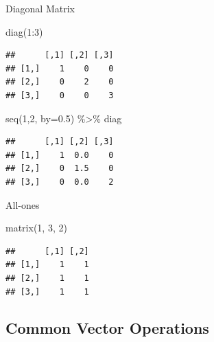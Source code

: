 \documentclass[
  ignorenonframetext,
]{beamer}
\newenvironment{Shaded}{\begin{snugshade}}{\end{snugshade}}
\newcommand{\AttributeTok}[1]{\textcolor[rgb]{0.77,0.63,0.00}{#1}}
\newcommand{\DecValTok}[1]{\textcolor[rgb]{0.00,0.00,0.81}{#1}}
\newcommand{\FloatTok}[1]{\textcolor[rgb]{0.00,0.00,0.81}{#1}}
\newcommand{\FunctionTok}[1]{\textcolor[rgb]{0.00,0.00,0.00}{#1}}
\newcommand{\NormalTok}[1]{#1}
\newcommand{\SpecialCharTok}[1]{\textcolor[rgb]{0.00,0.00,0.00}{#1}}
\begin{document}
\begin{frame}[fragile]{Diagonal Matrix}
\protect\hypertarget{diagonal-matrix}{}
\begin{Shaded}
\begin{Highlighting}[]
\FunctionTok{diag}\NormalTok{(}\DecValTok{1}\SpecialCharTok{:}\DecValTok{3}\NormalTok{)}
\end{Highlighting}
\end{Shaded}

\begin{verbatim}
##      [,1] [,2] [,3]
## [1,]    1    0    0
## [2,]    0    2    0
## [3,]    0    0    3
\end{verbatim}

\begin{Shaded}
\begin{Highlighting}[]
\FunctionTok{seq}\NormalTok{(}\DecValTok{1}\NormalTok{,}\DecValTok{2}\NormalTok{, }\AttributeTok{by=}\FloatTok{0.5}\NormalTok{) }\SpecialCharTok{\%\textgreater{}\%}\NormalTok{ diag}
\end{Highlighting}
\end{Shaded}

\begin{verbatim}
##      [,1] [,2] [,3]
## [1,]    1  0.0    0
## [2,]    0  1.5    0
## [3,]    0  0.0    2
\end{verbatim}
\end{frame}

\begin{frame}[fragile]{All-ones}
\protect\hypertarget{all-ones}{}
\begin{Shaded}
\begin{Highlighting}[]
\FunctionTok{matrix}\NormalTok{(}\DecValTok{1}\NormalTok{, }\DecValTok{3}\NormalTok{, }\DecValTok{2}\NormalTok{)}
\end{Highlighting}
\end{Shaded}

\begin{verbatim}
##      [,1] [,2]
## [1,]    1    1
## [2,]    1    1
## [3,]    1    1
\end{verbatim}
\end{frame}

\hypertarget{common-vector-operations}{%
\subsection{Common Vector Operations}\label{common-vector-operations}}
\end{document}
